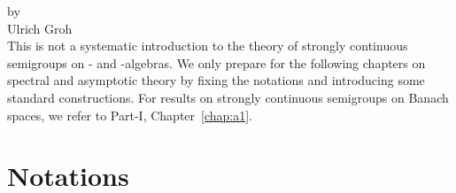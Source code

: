 \label{chap:d1}
\thispagestyle{empty}
{\Large
\vspace*{-.75cm}
by \\[.25em]
Ulrich Groh
\vspace{.75cm}
\\
}
This is not a systematic introduction to the theory of strongly continuous semigroups on \CA- and \WA-algebras.
We only prepare for the following chapters on spectral and asymptotic theory by fixing the notations and introducing some standard constructions.
For results on strongly continuous semigroups on Banach spaces, we refer to Part-I, Chapter~\ref{chap:a1}.
\section{Notations}\label{sec:d1-1}
